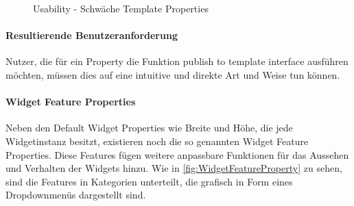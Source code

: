 \begin{figure}%
  \centering
  \qquad
  \caption{Usability - Schwäche Template Properties}%
  \label{fig:TemplateProperties}
\end{figure}


\paragraph{Resultierende Benutzeranforderung}
Nutzer, die für ein Property die Funktion \glqq publish to template interface\grqq{} ausführen möchten, müssen dies auf eine intuitive und direkte Art und Weise tun können.

\paragraph{Widget Feature Properties}

Neben den Default Widget Properties wie Breite und Höhe, die jede Widgetinstanz besitzt, existieren noch die so genannten Widget Feature Properties.
Diese Features fügen weitere anpassbare Funktionen für das Aussehen und Verhalten der Widgets hinzu.
Wie in \cref{fig:WidgetFeatureProperty} zu sehen, sind die Features in Kategorien unterteilt, die grafisch in Form eines Dropdownmenüs dargestellt sind.

